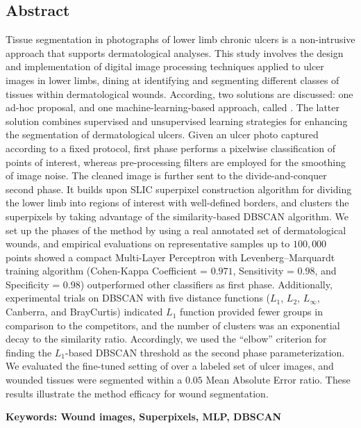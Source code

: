 \newpage

\blankpage

\begin{center}
\section*{Abstract}
\end{center}

\noindent
Tissue segmentation in photographs of lower limb chronic ulcers is a non-intrusive approach that supports dermatological analyses.
This study involves the design and implementation of digital image processing techniques  applied to ulcer images in lower limbs, dining at identifying and segmenting different classes of tissues within dermatological wounds.
According, two solutions are discussed: one ad-hoc proposal, and one machine-learning-based approach, called \system.
The latter solution combines supervised and unsupervised learning strategies for enhancing the segmentation of dermatological ulcers.
Given an ulcer photo captured according to a fixed protocol, \system first phase performs a pixelwise classification of points of interest, whereas pre-processing filters are employed for the smoothing of image noise.
The cleaned image is further sent to the \system divide-and-conquer second phase.
It builds upon SLIC superpixel construction algorithm for dividing the lower limb into regions of interest with well-defined borders, and clusters the superpixels by taking advantage of the similarity-based DBSCAN algorithm.
We set up the phases of the method by using a real annotated set of dermatological wounds, and empirical evaluations on representative samples up to $100{,}000$ points showed a compact Multi-Layer Perceptron with Levenberg--Marquardt training algorithm (Cohen-Kappa Coefficient = $0.971$, Sensitivity = $0.98$, and Specificity = $0.98$) outperformed other classifiers as \system first phase.
Additionally, experimental trials on DBSCAN with five distance functions ($L_1$, $L_2$, $L_\infty$, Canberra, and BrayCurtis) indicated $L_1$ function provided fewer groups in comparison to the competitors, and the number of clusters was an exponential decay to the similarity ratio.
Accordingly, we used the ``elbow'' criterion for finding the $L_1$-based DBSCAN threshold as the \system second phase parameterization.
We evaluated the fine-tuned setting of \system over a labeled set of ulcer images, and wounded tissues were segmented within a $0.05$ Mean Absolute Error ratio.
These results illustrate the method efficacy for wound segmentation.

\vspace{1cm}

\noindent \textbf{Keywords: Wound images, Superpixels, MLP, DBSCAN}
\newpage
\blankpage
